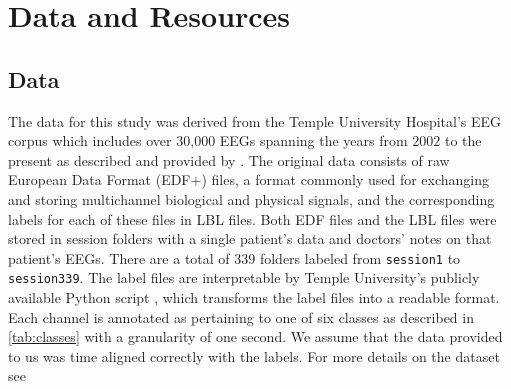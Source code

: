 \chapter{Data and Resources}
\label{dataresources}

\section{Data}
\label{data}
The data for this study was derived from the Temple University Hospital's EEG corpus which includes over $30\text{,}000$ EEGs spanning the years from $2002$ to the present as described and provided by \citet{tuhwebsite}. The original data consists of raw European Data Format (EDF+) files, a format commonly used for exchanging and storing multichannel biological and physical signals, and the corresponding labels for each of these files in LBL files. Both EDF files and the LBL files were stored in session folders with a single patient's data and doctors' notes on that patient's EEGs. There are a total of $339$ folders labeled from \verb+session1+ to \verb+session339+. The label files are interpretable by Temple University's publicly available Python script \cite{tuhwebsite}, which transforms the label files into a readable format.  Each channel is annotated as pertaining to one of six classes as described in \cref{tab:classes} with a granularity of one second. We assume that the data provided to us was time aligned correctly with the labels. For more details on the dataset see \citet{tuh}


